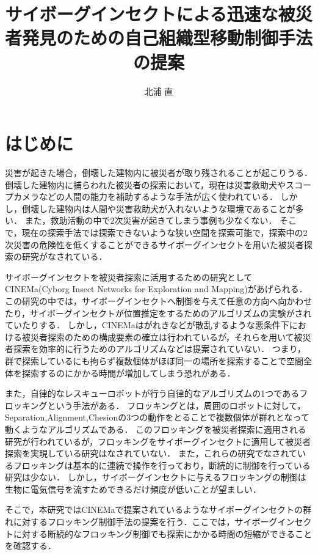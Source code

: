 \documentclass[a4paper,11pt]{jarticle}
\title{サイボーグインセクトによる迅速な被災者発見のための自己組織型移動制御手法の提案}
\author{北浦 直}
\begin{document}
	\titlepage    %
	\abstract     %
	\keyword
	\tableofcontents    %
	\section{はじめに}
	災害が起きた場合，倒壊した建物内に被災者が取り残されることが起こりうる．
	倒壊した建物内に捕らわれた被災者の探索において，現在は災害救助犬やスコープカメラなどの人間の能力を補助するような手法が広く使われている．
	しかし，倒壊した建物内は人間や災害救助犬が入れないような環境であることが多い．%
	また，救助活動の中で2次災害が起きてしまう事例も少なくない．
	そこで，現在の探索手法では探索できないような狭い空間を探索可能で，探索中の2次災害の危険性を低くすることができるサイボーグインセクトを用いた被災者探索の研究がなされている．

	サイボーグインセクトを被災者探索に活用するための研究としてCINEMa(Cyborg Insect Networks for Exploration and Mapping)があげられる．
	この研究の中では，サイボーグインセクトへ制御を与えて任意の方向へ向かわせたり，サイボーグインセクトが位置推定をするためのアルゴリズムの実験がされていたりする．
	しかし，CINEMaはがれきなどが散乱するような悪条件下における被災者探索のための構成要素の確立は行われているが，それらを用いて被災者探索を効率的に行うためのアルゴリズムなどは提案されていない．
	つまり，群で探索しているにも拘らず複数個体がほぼ同一の場所を探索することで空間全体を探索するのにかかる時間が増加してしまう恐れがある．
		
	また，自律的なレスキューロボットが行う自律的なアルゴリズムの1つであるフロッキングという手法がある．
	フロッキングとは，周囲のロボットに対して，Separation,Alignment,Chesionの3つの動作をとることで複数個体が群れとなって動くようなアルゴリズムである．
	このフロッキングを被災者探索に適用される研究が行われているが，フロッキングをサイボーグインセクトに適用して被災者探索を実現している研究はなされていない．
	また，これらの研究でなされているフロッキングは基本的に連続で操作を行っており，断続的に制御を行っている研究は少ない．
	しかし，サイボーグインセクトに与えるフロッキングの制御は生物に電気信号を流すためできるだけ頻度が低いことが望ましい．
	
	そこで，本研究ではCINEMaで提案されているようなサイボーグインセクトの群れに対するフロッキング制御手法の提案を行う．ここでは，サイボーグインセクトに対する断続的なフロッキング制御でも探索にかかる時間の短縮ができることを確認する．
	
\end{document}
